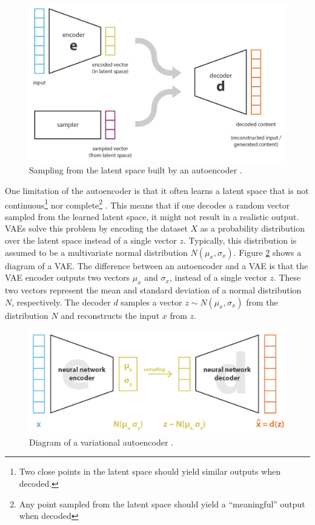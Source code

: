 \begin{figure}[!h]
 \centering
 \includegraphics[width=0.7\columnwidth]{imgs/background/ae_sampling.png}
 \caption{Sampling from the latent space built by an autoencoder \cite{rocca2019understanding}.}
 \label{fig:ae_sampling}
\end{figure}

One limitation of the autoencoder is that it often learns a latent space that is not continuous\footnote{Two close points in the latent space should yield similar outputs when decoded.} nor complete\footnote{Any point sampled from the latent space should yield a ``meaningful'' output when decoded} \cite{roberts2018hierarchical}. This means that if one decodes a random vector sampled from the learned latent space, it might not result in a realistic output. VAEs solve this problem by encoding the dataset $X$ as a probability distribution over the latent space instead of a single vector $z$. Typically, this distribution is assumed to be a multivariate normal distribution $N(\mu_x, \sigma_x)$. Figure \ref{fig:vae} shows a diagram of a VAE. The difference between an autoencoder and a VAE is that the VAE encoder outputs two vectors $\mu_x$ and $\sigma_x$, instead of a single vector $z$. These two vectors represent the mean and standard deviation of a normal distribution $N$, respectively. The decoder $d$ samples a vector $z \sim N(\mu_x, \sigma_x)$ from the distribution $N$ and reconstructs the input $x$ from $z$.

\begin{figure}[!h]
 \centering
 \includegraphics[width=0.8\columnwidth]{imgs/background/vae.png}
 \caption{Diagram of a variational autoencoder \cite{rocca2019understanding}.}
 \label{fig:vae}
\end{figure}


